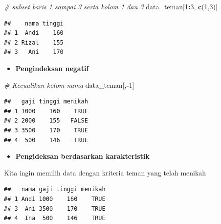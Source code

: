\documentclass[]{book}
\newenvironment{Shaded}{\begin{snugshade}}{\end{snugshade}}
\newcommand{\KeywordTok}[1]{\textcolor[rgb]{0.13,0.29,0.53}{\textbf{#1}}}
\newcommand{\DecValTok}[1]{\textcolor[rgb]{0.00,0.00,0.81}{#1}}
\newcommand{\CommentTok}[1]{\textcolor[rgb]{0.56,0.35,0.01}{\textit{#1}}}
\newcommand{\OtherTok}[1]{\textcolor[rgb]{0.56,0.35,0.01}{#1}}
\newcommand{\OperatorTok}[1]{\textcolor[rgb]{0.81,0.36,0.00}{\textbf{#1}}}
\newcommand{\NormalTok}[1]{#1}
\providecommand{\tightlist}{%
  \setlength{\itemsep}{0pt}\setlength{\parskip}{0pt}}
\begin{document}
\begin{Shaded}
\begin{Highlighting}[]
\CommentTok{# subset baris 1 sampai 3 serta kolom 1 dan 3}
\NormalTok{data_teman[}\DecValTok{1}\OperatorTok{:}\DecValTok{3}\NormalTok{, }\KeywordTok{c}\NormalTok{(}\DecValTok{1}\NormalTok{,}\DecValTok{3}\NormalTok{)]}
\end{Highlighting}
\end{Shaded}

\begin{verbatim}
##    nama tinggi
## 1  Andi    160
## 2 Rizal    155
## 3   Ani    170
\end{verbatim}

\begin{itemize}
\tightlist
\item
  \textbf{Pengindeksan negatif}
\end{itemize}

\begin{Shaded}
\begin{Highlighting}[]
\CommentTok{# Kecualikan kolom nama}
\NormalTok{data_teman[,}\OperatorTok{-}\DecValTok{1}\NormalTok{]}
\end{Highlighting}
\end{Shaded}

\begin{verbatim}
##   gaji tinggi menikah
## 1 1000    160    TRUE
## 2 2000    155   FALSE
## 3 3500    170    TRUE
## 4  500    146    TRUE
\end{verbatim}

\begin{itemize}
\tightlist
\item
  \textbf{Pengideksan berdasarkan karakteristik}
\end{itemize}

Kita ingin memilih data dengan kriteria teman yang telah menikah

\begin{Shaded}
\end{Shaded}

\begin{verbatim}
##   nama gaji tinggi menikah
## 1 Andi 1000    160    TRUE
## 3  Ani 3500    170    TRUE
## 4  Ina  500    146    TRUE
\end{verbatim}
\end{document}

